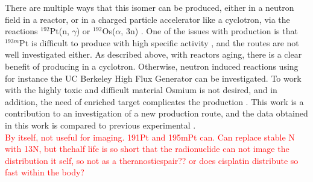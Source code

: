 There are multiple ways that this isomer can be produced, either in a neutron field in a reactor, or in a charged particle accelerator like a cyclotron, via the reactions $^{192}$Pt(n, $\gamma$) \cite{Qaim2017c} or $^{192}$Os($\alpha$, 3n) \cite{Hilgers2008}. One of the issues with production is that $^{193m}$Pt is difficult to produce with high specific activity \cite{Qaim2017c}, and the routes are not well investigated either. As described above, with reactors aging, there is a clear benefit of producing in a cyclotron. Otherwise, neutron induced reactions using for instance the UC Berkeley High Flux Generator \cite{Voyles2017c} can be investigated. To work with the highly toxic and difficult material Osmium is not desired, and in addition, the need of enriched target complicates the production \cite{Hilgers2009}. This work is a contribution to an investigation of a new production route, and the data obtained in this work is compared to previous experimental \cite{Tarkanyi2019, Tarkanyi2006a}. \\ 

\textcolor{red}{By itself, not useful for imaging.  191Pt and 195mPt can.  Can replace stable N with 13N, but thehalf life is so short that the radionuclide can not image the distribution it self, so not as a theranosticspair??  or does cisplatin distribute so fast within the body?}


